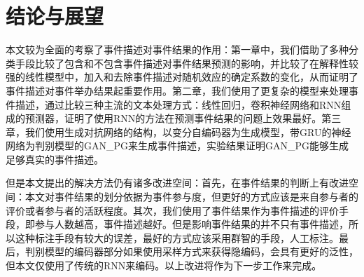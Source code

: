 % 
\section{结论与展望}
本文较为全面的考察了事件描述对事件结果的作用：第一章中，我们借助了多种分类手段比较了包含和不包含事件描述对事件结果预测的影响，并比较了在解释性较强的线性模型中，加入和去除事件描述对随机效应的确定系数的变化，从而证明了事件描述对事件举办结果起重要作用。第二章，我们使用了更复杂的模型来处理事件描述，通过比较三种主流的文本处理方式：线性回归，卷积神经网络和RNN组成的预测器，证明了使用RNN的方法在预测事件结果的问题上效果最好。第三章，我们使用生成对抗网络的结构，以变分自编码器为生成模型，带GRU的神经网络为判别模型的GAN\_PG来生成事件描述，实验结果证明GAN\_PG能够生成足够真实的事件描述。

但是本文提出的解决方法仍有诸多改进空间：首先，在事件结果的判断上有改进空间：本文对事件结果的划分依据为事件参与度，但更好的方式应该是来自参与者的评价或者参与者的活跃程度。其次，我们使用了事件结果作为事件描述的评价手段，即参与人数越高，事件描述越好。但是影响事件结果的并不只有事件描述，所以这种标注手段有较大的误差，最好的方式应该采用群智的手段，人工标注。最后，判别模型的编码器部分如果使用采样方式来获得隐编码，会具有更好的泛性，但本文仅使用了传统的RNN来编码。以上改进将作为下一步工作来完成。
% 